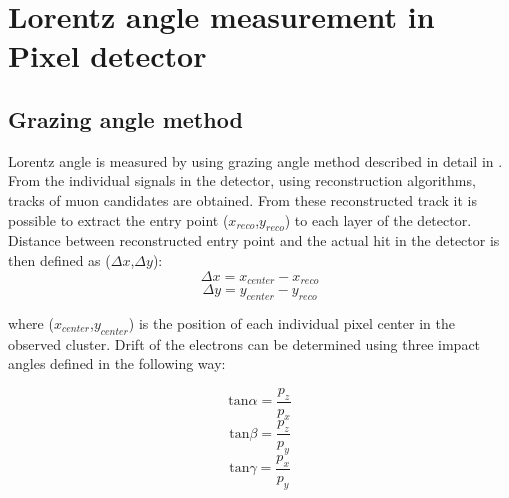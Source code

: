 
\chapter{Lorentz angle measurement in Pixel detector} %

\label{AppendixA} %


\section{Grazing angle method}
Lorentz angle is measured by using grazing angle method described in detail in \cite{Henrich}. From the individual signals in the detector, using reconstruction algorithms, tracks of muon candidates are obtained. From these reconstructed track it is possible to extract the entry point ($x_{reco}$,$y_{reco}$) to each layer of the detector. 
Distance between reconstructed entry point and the actual hit in the detector is then defined as ($\Delta x$,$\Delta y$):
\begin{equation}
\Delta x = x_{center}-x_{reco}
\end{equation} 
\begin{equation}
\Delta y = y_{center}-y_{reco}
\end{equation} 

where ($x_{center}$,$y_{center}$) is the position of each individual pixel center in the observed cluster. Drift of the electrons can be determined using three impact angles defined in the following way:

\begin{equation}
\text{tan} \alpha = \frac{p_z}{p_x}
\end{equation}
\begin{equation}
\text{tan} \beta = \frac{p_z}{p_y}
\end{equation}
\begin{equation}
\text{tan} \gamma = \frac{p_x}{p_y}
\end{equation}

